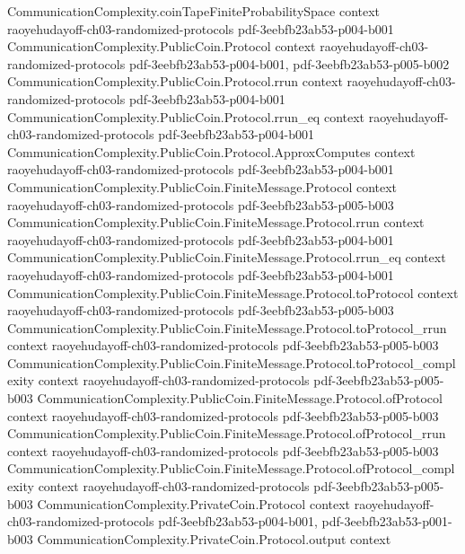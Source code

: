\begin{theorem}
\proofstep
  {CommunicationComplexity.coinTapeFiniteProbabilitySpace}
  {context}
  {raoyehudayoff-ch03-randomized-protocols}
  {pdf-3eebfb23ab53-p004-b001}
\proofstep
  {CommunicationComplexity.PublicCoin.Protocol}
  {context}
  {raoyehudayoff-ch03-randomized-protocols}
  {pdf-3eebfb23ab53-p004-b001,
    pdf-3eebfb23ab53-p005-b002}
\proofstep
  {CommunicationComplexity.PublicCoin.Protocol.rrun}
  {context}
  {raoyehudayoff-ch03-randomized-protocols}
  {pdf-3eebfb23ab53-p004-b001}
\proofstep
  {CommunicationComplexity.PublicCoin.Protocol.rrun_eq}
  {context}
  {raoyehudayoff-ch03-randomized-protocols}
  {pdf-3eebfb23ab53-p004-b001}
\proofstep
  {CommunicationComplexity.PublicCoin.Protocol.ApproxComputes}
  {context}
  {raoyehudayoff-ch03-randomized-protocols}
  {pdf-3eebfb23ab53-p004-b001}
\proofstep
  {CommunicationComplexity.PublicCoin.FiniteMessage.Protocol}
  {context}
  {raoyehudayoff-ch03-randomized-protocols}
  {pdf-3eebfb23ab53-p005-b003}
\proofstep
  {CommunicationComplexity.PublicCoin.FiniteMessage.Protocol.rrun}
  {context}
  {raoyehudayoff-ch03-randomized-protocols}
  {pdf-3eebfb23ab53-p004-b001}
\proofstep
  {CommunicationComplexity.PublicCoin.FiniteMessage.Protocol.rrun_eq}
  {context}
  {raoyehudayoff-ch03-randomized-protocols}
  {pdf-3eebfb23ab53-p004-b001}
\proofstep
  {CommunicationComplexity.PublicCoin.FiniteMessage.Protocol.toProtocol}
  {context}
  {raoyehudayoff-ch03-randomized-protocols}
  {pdf-3eebfb23ab53-p005-b003}
\proofstep
  {CommunicationComplexity.PublicCoin.FiniteMessage.Protocol.toProtocol_rrun}
  {context}
  {raoyehudayoff-ch03-randomized-protocols}
  {pdf-3eebfb23ab53-p005-b003}
\proofstep
  {CommunicationComplexity.PublicCoin.FiniteMessage.Protocol.toProtocol_complexity}
  {context}
  {raoyehudayoff-ch03-randomized-protocols}
  {pdf-3eebfb23ab53-p005-b003}
\proofstep
  {CommunicationComplexity.PublicCoin.FiniteMessage.Protocol.ofProtocol}
  {context}
  {raoyehudayoff-ch03-randomized-protocols}
  {pdf-3eebfb23ab53-p005-b003}
\proofstep
  {CommunicationComplexity.PublicCoin.FiniteMessage.Protocol.ofProtocol_rrun}
  {context}
  {raoyehudayoff-ch03-randomized-protocols}
  {pdf-3eebfb23ab53-p005-b003}
\proofstep
  {CommunicationComplexity.PublicCoin.FiniteMessage.Protocol.ofProtocol_complexity}
  {context}
  {raoyehudayoff-ch03-randomized-protocols}
  {pdf-3eebfb23ab53-p005-b003}
\proofstep
  {CommunicationComplexity.PrivateCoin.Protocol}
  {context}
  {raoyehudayoff-ch03-randomized-protocols}
  {pdf-3eebfb23ab53-p004-b001,
    pdf-3eebfb23ab53-p001-b003}
\proofstep
  {CommunicationComplexity.PrivateCoin.Protocol.output}
  {context}

\end{theorem}
